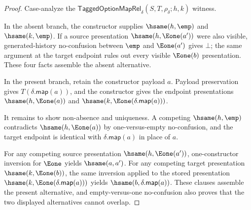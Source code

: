 \begin{proof}
Case-analyze the
$\mathsf{TaggedOptionMapRel}_{\delta}(S,T,\rho_{\delta};h,k)$ witness.

In the absent branch, the constructor supplies $\hsame(h,\emp)$ and
$\hsame(k,\emp)$. If a source presentation $\hsame(h,\Eone(a'))$ were also
visible, generated-history no-confusion between $\emp$ and $\Eone(a')$ gives
$\bot$; the same argument at the target endpoint rules out every visible
$\Eone(b)$ presentation. These four facts assemble the absent alternative.

In the present branch, retain the constructor payload $a$. Payload preservation
gives $T(\delta.\mathsf{map}(a))$, and the constructor gives the endpoint
presentations $\hsame(h,\Eone(a))$ and
$\hsame(k,\Eone(\delta.\mathsf{map}(a)))$.

It remains to show non-absence and uniqueness. A competing
$\hsame(h,\emp)$ contradicts $\hsame(h,\Eone(a))$ by one-versus-empty
no-confusion, and the target endpoint is identical with
$\delta.\mathsf{map}(a)$ in place of $a$.

For any competing source presentation $\hsame(h,\Eone(a'))$, one-constructor
inversion for $\Eone$ yields $\hsame(a,a')$. For any competing target
presentation $\hsame(k,\Eone(b))$, the same inversion applied to the stored
presentation $\hsame(k,\Eone(\delta.\mathsf{map}(a)))$ yields
$\hsame(b,\delta.\mathsf{map}(a))$. These clauses assemble the present
alternative, and empty-versus-one no-confusion also proves that the two displayed
alternatives cannot overlap.
\end{proof}

